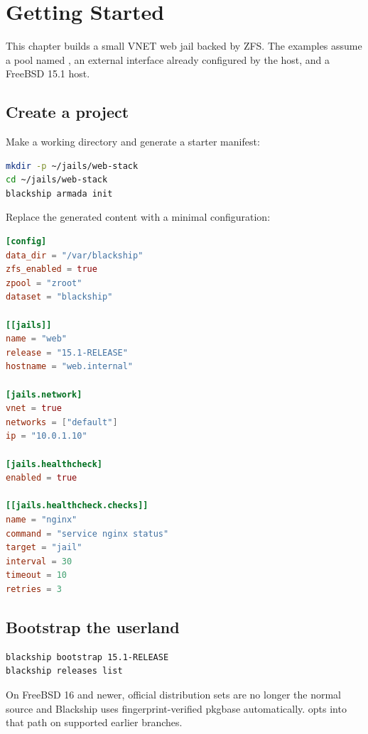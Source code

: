 \chapter{Getting Started}
\label{ch:getting-started}

This chapter builds a small VNET web jail backed by ZFS. The examples assume a
pool named , an external interface already configured by the
host, and a FreeBSD 15.1 host.

\section{Create a project}

Make a working directory and generate a starter manifest:

\begin{lstlisting}[language=bash]
mkdir -p ~/jails/web-stack
cd ~/jails/web-stack
blackship armada init
\end{lstlisting}

Replace the generated content with a minimal configuration:

\begin{lstlisting}[language=TOML]
[config]
data_dir = "/var/blackship"
zfs_enabled = true
zpool = "zroot"
dataset = "blackship"

[[jails]]
name = "web"
release = "15.1-RELEASE"
hostname = "web.internal"

[jails.network]
vnet = true
networks = ["default"]
ip = "10.0.1.10"

[jails.healthcheck]
enabled = true

[[jails.healthcheck.checks]]
name = "nginx"
command = "service nginx status"
target = "jail"
interval = 30
timeout = 10
retries = 3
\end{lstlisting}

\section{Bootstrap the userland}

\begin{lstlisting}[language=bash]
blackship bootstrap 15.1-RELEASE
blackship releases list
\end{lstlisting}

On FreeBSD 16 and newer, official distribution sets are no longer the normal
source and Blackship uses fingerprint-verified pkgbase automatically.
 opts into that path on supported earlier branches.

